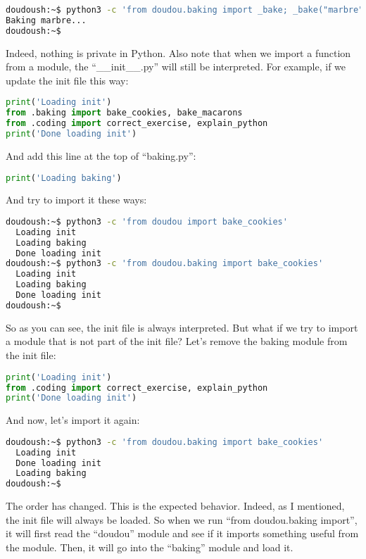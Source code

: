 \begin{lstlisting}[language=bash]
doudoush:~$ python3 -c 'from doudou.baking import _bake; _bake("marbre")'
Baking marbre...
doudoush:~$
\end{lstlisting}

Indeed, nothing is private in Python. Also note that when we import a function from
a module, the ``\_\_init\_\_.py'' will still be interpreted. For example, if we update
the init file this way:

\begin{lstlisting}[language=python]
print('Loading init')
from .baking import bake_cookies, bake_macarons
from .coding import correct_exercise, explain_python
print('Done loading init')
\end{lstlisting}

And add this line at the top of ``baking.py'':
\begin{lstlisting}[language=python]
print('Loading baking')
\end{lstlisting}


And try to import it these ways:

\begin{lstlisting}[language=bash]
doudoush:~$ python3 -c 'from doudou import bake_cookies'
  Loading init
  Loading baking
  Done loading init
doudoush:~$ python3 -c 'from doudou.baking import bake_cookies'
  Loading init
  Loading baking
  Done loading init
doudoush:~$
\end{lstlisting}

So as you can see, the init file is always interpreted. But what if we try to import
a module that is not part of the init file? Let's remove the baking module from the
init file:

\begin{lstlisting}[language=python]
print('Loading init')
from .coding import correct_exercise, explain_python
print('Done loading init')
\end{lstlisting}

And now, let's import it again:

\begin{lstlisting}[language=bash]
doudoush:~$ python3 -c 'from doudou.baking import bake_cookies'
  Loading init
  Done loading init
  Loading baking
doudoush:~$
\end{lstlisting}

The order has changed. This is the expected behavior. Indeed, as I mentioned, the
init file will always be loaded. So when we run ``from doudou.baking import'',
it will first read the ``doudou'' module and see if it imports something useful from
the module. Then, it will go into the ``baking'' module and load it.

